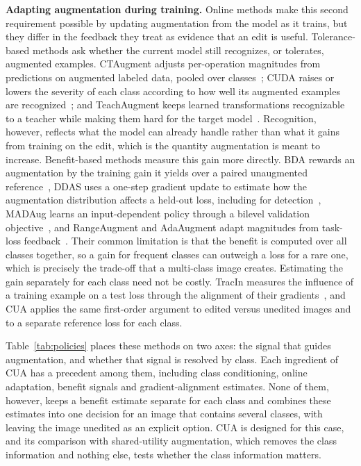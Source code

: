 \documentclass[conference]{IEEEtran}
\begin{document}
\noindent\textbf{Adapting augmentation during training.} Online methods make this second requirement possible by updating augmentation from the model as it trains, but they differ in the feedback they treat as evidence that an edit is useful. Tolerance-based methods ask whether the current model still recognizes, or tolerates, augmented examples. CTAugment adjusts per-operation magnitudes from predictions on augmented labeled data, pooled over classes~\cite{berthelot2020}; CUDA raises or lowers the severity of each class according to how well its augmented examples are recognized~\cite{ahn2023cuda}; and TeachAugment keeps learned transformations recognizable to a teacher while making them hard for the target model~\cite{suzuki2022teach}. Recognition, however, reflects what the model can already handle rather than what it gains from training on the edit, which is the quantity augmentation is meant to increase. Benefit-based methods measure this gain more directly. BDA rewards an augmentation by the training gain it yields over a paired unaugmented reference~\cite{lu2023bda}, DDAS uses a one-step gradient update to estimate how the augmentation distribution affects a held-out loss, including for detection~\cite{liu2021ddas}, MADAug learns an input-dependent policy through a bilevel validation objective~\cite{hou2023madaug}, and RangeAugment and AdaAugment adapt magnitudes from task-loss feedback~\cite{mehta2022rangeaugment,yang2025adaaugment}. Their common limitation is that the benefit is computed over all classes together, so a gain for frequent classes can outweigh a loss for a rare one, which is precisely the trade-off that a multi-class image creates. Estimating the gain separately for each class need not be costly. TracIn measures the influence of a training example on a test loss through the alignment of their gradients~\cite{pruthi2020tracin}, and CUA applies the same first-order argument to edited versus unedited images and to a separate reference loss for each class.

Table~\ref{tab:policies} places these methods on two axes: the signal that guides augmentation, and whether that signal is resolved by class. Each ingredient of CUA has a precedent among them, including class conditioning, online adaptation, benefit signals and gradient-alignment estimates. None of them, however, keeps a benefit estimate separate for each class and combines these estimates into one decision for an image that contains several classes, with leaving the image unedited as an explicit option. CUA is designed for this case, and its comparison with shared-utility augmentation, which removes the class information and nothing else, tests whether the class information matters.
\end{document}
